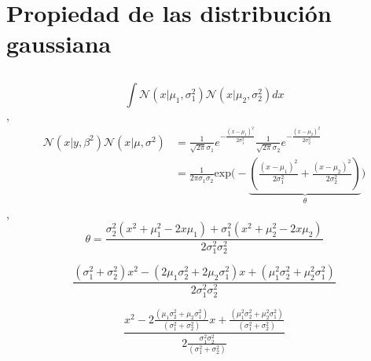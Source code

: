\documentclass[a4paper,11pt]{book}
\newcommand{\N}{\mathcal{N}}
\theoremstyle{definition}
\newif\ifen
\newif\ifes
\newcommand{\en}[1]{\ifen#1\fi}
\newcommand{\es}[1]{\ifes#1\fi}
\begin{document}
\section{Propiedad de las distribuci\'on gaussiana} \label{sec:propiedades_de_la_gaussiana}

\subsection{\en{Gaussian product}}\label{multiplicacion_normales}

\en{The problem we must solve is}
\es{El problema que tenemos que resolver es}
\begin{equation}
 \int \N(x|\mu_1,\sigma_1^2)\N(x|\mu_2,\sigma_2^2) dx
\end{equation}
%
\en{By definition},
\begin{equation}
\begin{split}
 \N(x|y,\beta^2)\N(x|\mu,\sigma^2) & = \frac{1}{\sqrt{2\pi}\sigma_1}e^{-\frac{(x-\mu_1)^2}{2\sigma_1^2}} \frac{1}{\sqrt{2\pi}\sigma_2}e^{-\frac{(x-\mu_2)^2}{2\sigma_2^2}}  \\
 & = \frac{1}{2\pi\sigma_1\sigma_2}\text{exp}\Bigg(-\underbrace{\left( \frac{(x-\mu_1)^2}{2\sigma_1^2} + \frac{(x-\mu_2)^2}{2\sigma_2^2} \right)}_{\theta} \Bigg)
\end{split}
\end{equation}
%
\en{Then},
\begin{equation}
 \theta = \frac{\sigma_2^2(x^2 + \mu_1^2 - 2x\mu_1) + \sigma_1^2(x^2 + \mu_2^2 - 2x\mu_2) }{2\sigma_1^2\sigma_2^2}
\end{equation}
%
\en{We expand and reorder the factors by powers of $x$}
\es{Expando y reordeno los factores por potencias de $x$}
\begin{equation}
 \frac{(\sigma_1^2 + \sigma_2^2) x^2 - (2\mu_1\sigma_2^2 + 2\mu_2\sigma_1^2) x + (\mu_1^2\sigma_2^2 + \mu_2^2\sigma_1^2)}{2\sigma_1^2\sigma_2^2}
\end{equation}
%
\en{We divide the numerator and denominator by the factor of $x^2$}
\es{Divido al numerador y el denominador por el factor de $x^2$}
\begin{equation}
 \frac{x^2 - 2\frac{(\mu_1\sigma_2^2 + \mu_2\sigma_1^2)}{(\sigma_1^2 + \sigma_2^2) } x + \frac{(\mu_1^2\sigma_2^2 + \mu_2^2\sigma_1^2)}{(\sigma_1^2 + \sigma_2^2) }}{2\frac{\sigma_1^2\sigma_2^2}{(\sigma_1^2 + \sigma_2^2)}}
\end{equation}
%
\en{This equation is quadratic in x, and is therefore proportional to a Gaussian density function with standar deviation}
\end{document}
